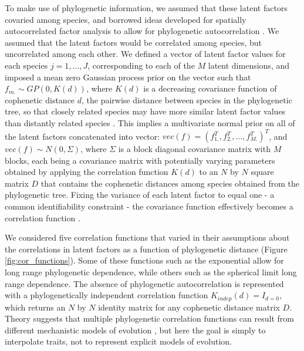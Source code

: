 To make use of phylogenetic information, we assumed that these latent factors covaried among species, and borrowed ideas developed for spatially autocorrelated factor analysis to allow for phylogenetic autocorrelation \citep{Hogan2004}.
We assumed that the latent factors would be correlated among species, but uncorrelated among each other.
We defined a vector of latent factor values for each species $j=1, ..., J$, corresponding to each of the $M$ latent dimensions, and imposed a mean zero Gaussian process prior on the vector such that $f_{m.} \sim GP(0, K(d))$, where $K(d)$ is a decreasing covariance function of cophenetic distance $d$, the pairwise distance between species in the phylogenetic tree, so that closely related species may have more similar latent factor values than distantly related species \citep{Neal1998}.
This implies a multivariate normal prior on all of the latent factors concatenated into vector: $vec(f) = (f_{1.}^T, f_{2.}^T, ..., f_{M.}^T)^T$, and $vec(f) \sim N(0, \Sigma)$, where $\Sigma$ is a block diagonal covariance matrix with $M$ blocks, each being a covariance matrix with potentially varying parameters obtained by applying the correlation function $K(d)$ to an $N$ by $N$ square matrix $D$ that contains the cophenetic distances among species obtained from the phylogenetic tree.
Fixing the variance of each latent factor to equal one - a common identifiability constraint - the covariance function effectively becomes a correlation function \citep{Shapiro1985}.

We considered five correlation functions that varied in their assumptions about the correlations in latent factors as a function of phylogenetic distance (Figure \ref{fig:cor_functions}).
Some of these functions such as the exponential allow for long range phylogenetic dependence, while others such as the spherical limit long range dependence.
The absence of phylogenetic autocorrelation is represented with a phylogenetically independent correlation function $K_{indep}(d) = I_{d = 0}$, which returns an $N$ by $N$ identity matrix for any cophenetic distance matrix $D$.
Theory suggests that multiple phylogenetic correlation functions can result from different mechanistic models of evolution \citep{Hansen1996}, but here the goal is simply to interpolate traits, not to represent explicit models of evolution.

